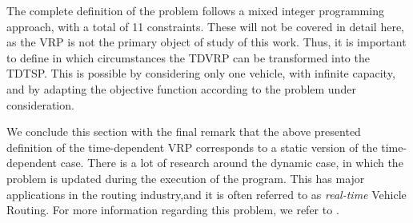 The complete definition of the problem follows a mixed integer programming approach, with a total of 11 constraints. These will not be covered in detail here, as the VRP is not the primary object of study of this work. Thus, it is important to define in which circumstances the TDVRP can be transformed into the TDTSP. This is possible by considering only one vehicle, with infinite capacity, and by adapting the objective function according to the problem under consideration.

We conclude this section with the final remark that the above presented definition of the time-dependent VRP corresponds to a static version of the time-dependent case. There is a lot of research around the dynamic case, in which the problem is updated during the execution of the program. This has major applications in the routing industry,and it is often referred to as \textit{real-time} Vehicle Routing. For more information regarding this problem, we refer to \cite{real_time_vrp} \cite{dynamic_vrp}.



